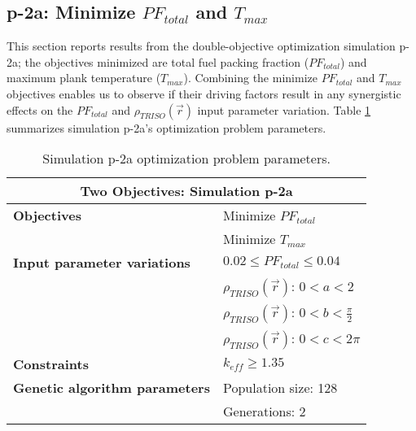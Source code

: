 \subsection{p-2a: Minimize $PF_{total}$ and $T_{max}$}
\label{sec:p-2a}
This section reports results from the double-objective optimization simulation p-2a; the 
objectives minimized are total fuel packing fraction ($PF_{total}$) and maximum plank
temperature ($T_{max}$).  
Combining the minimize $PF_{total}$ and $T_{max}$ objectives enables us to observe if 
their driving factors result in any synergistic effects on the $PF_{total}$ and 
$\rho_{TRISO}(\vec{r})$ input parameter variation. 
Table \ref{tab:simulationp2a} summarizes simulation p-2a's optimization problem parameters.
\begin{table}[htbp!]
    \centering
    \onehalfspacing
    \caption{Simulation p-2a optimization problem parameters.}
	\label{tab:simulationp2a}
    \footnotesize
    \begin{tabular}{l|p{4cm}}
    \hline 
    \multicolumn{2}{c}{\textbf{Two Objectives: Simulation p-2a}} \\
    \hline 
    \textbf{Objectives} & Minimize $PF_{total}$ \\
    & Minimize $T_{max}$ \\
    \hline 
    \textbf{Input parameter variations} & $0.02 \leq PF_{total} \leq 0.04$ \\
    & $\rho_{TRISO}(\vec{r})$: $0<a<2$ \\
    & $\rho_{TRISO}(\vec{r})$: $0<b<\frac{\pi}{2}$ \\
    & $\rho_{TRISO}(\vec{r})$: $0<c<2\pi$ \\
    \hline
    \textbf{Constraints} & $k_{eff} \geq 1.35$\\ 
    \hline 
    \textbf{Genetic algorithm parameters} & Population size: 128 \\
    & Generations: 2 \\
    \hline
    \end{tabular}
\end{table}


